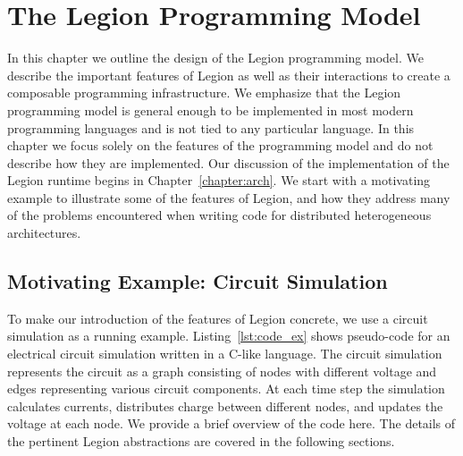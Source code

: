 

\chapter{The Legion Programming Model}
\label{chapter:model}
In this chapter we outline the design of the
Legion programming model.  We describe the
important features of Legion as well as 
their interactions to create a composable programming
infrastructure. We emphasize that the Legion
programming model is general enough to be 
implemented in most modern programming languages
and is not tied to any particular language.
In this chapter we focus solely on the features
of the programming model and do not describe
how they are implemented.  Our discussion of
the implementation of the Legion runtime begins
in Chapter~\ref{chapter:arch}. We start with 
a motivating example to illustrate some of the
features of Legion, and how they address many
of the problems encountered when writing code
for distributed heterogeneous architectures.


\section{Motivating Example: Circuit Simulation}
\label{sec:circuit}
To make our introduction of the features of
Legion concrete, we use a circuit simulation as
a running example. Listing~\ref{lst:code_ex}
shows pseudo-code for an electrical circuit simulation
written in a C-like language. The circuit simulation
represents the circuit as a graph consisting of nodes
with different voltage and edges representing various
circuit components. At each time step the simulation 
calculates currents, distributes charge between different 
nodes, and updates the voltage at each node. We provide 
a brief overview of the code here. The details of the 
pertinent Legion abstractions are covered in the 
following sections.

